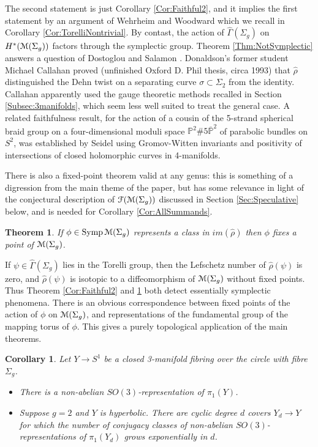 \documentclass[reqno,10pt]{amsart}
\numberwithin{equation}{section}
\newcommand{\bP}{{\mathbb P}}
\newcommand{\scrF}{\EuScript{F}}
\newcommand{\scrM}{\EuScript{M}}
\newcommand{\Symp}{\operatorname{Symp}}
\newtheorem{Theorem}[thm]{Theorem}
\newtheorem{Corollary}[thm]{Corollary}
\theoremstyle{remark}
\begin{document}
The second statement is just Corollary \ref{Cor:Faithful2}, and it implies the first statement by an argument of Wehrheim and Woodward which we recall in Corollary \ref{Cor:TorelliNontrivial}. By contast, the action of $\widehat{\Gamma}(\Sigma_g)$ on $H^*(\scrM(\Sigma_g))$ factors through the symplectic group. Theorem \ref{Thm:NotSymplectic} answers a question of Dostoglou and Salamon \cite[Remark 5.6]{DS2}. Donaldson's former student Michael Callahan proved (unfinished Oxford D. Phil thesis, circa 1993) that $\hat\rho$ distinguished the Dehn twist on a separating curve $\sigma \subset \Sigma_2$ from the identity. Callahan apparently used the gauge theoretic methods recalled in Section \ref{Subsec:3manifolds}, which seem less well suited to treat the general case.   A related faithfulness result, for the action of a cousin of the 5-strand spherical braid group on a four-dimensional moduli space $\bP^2\# 5\overline{\bP}^2$ of parabolic bundles on $S^2$,  was established by Seidel \cite[Example 2.13]{Seidel:4dim} using Gromov-Witten invariants and positivity of intersections of closed holomorphic curves in 4-manifolds.  

 There is also a fixed-point theorem valid at any genus: this is something of a digression from the main theme of the paper, but has some relevance in light of the conjectural description of $\scrF(\scrM(\Sigma_g))$ discussed in Section \ref{Sec:Speculative} below, and is needed for Corollary \ref{Cor:AllSummands}.

\begin{Theorem} \label{Thm:FixPoint}
If $\phi \in \Symp \scrM(\Sigma_g)$ represents a class in $im(\hat{\rho})$ then $\phi$ fixes a point of $\scrM(\Sigma_g)$. 
\end{Theorem}


If $\psi \in \widehat\Gamma(\Sigma_g)$ lies in the Torelli group, then the Lefschetz number of $\hat\rho(\psi)$ is zero, and $\hat\rho(\psi)$ is isotopic to a diffeomorphism of $\scrM(\Sigma_g)$ without fixed points.  Thus Theorem \ref{Cor:Faithful2} and \ref{Thm:FixPoint}  both detect essentially symplectic phenomena.   There is an obvious correspondence between fixed points of the action of $\phi$ on $\scrM(\Sigma_g)$, and representations of the fundamental group of the mapping torus of $\phi$.  This gives a purely topological application of the main theorems.

\begin{Corollary} \label{Cor:RepnGrowth}
Let $Y \rightarrow S^1$ be a closed 3-manifold fibring over the circle with fibre $\Sigma_g$.
\begin{itemize} 
\item There is a non-abelian $SO(3)$-representation of $\pi_1(Y)$.
\item Suppose $g=2$ and $Y$ is hyperbolic.  There are cyclic degree $d$ covers $Y_d\rightarrow Y$ for which the number of conjugacy classes of non-abelian $SO(3)$-representations of $\pi_1(Y_d)$  grows exponentially in $d$.
\end{itemize}
\end{Corollary}
\end{document}
